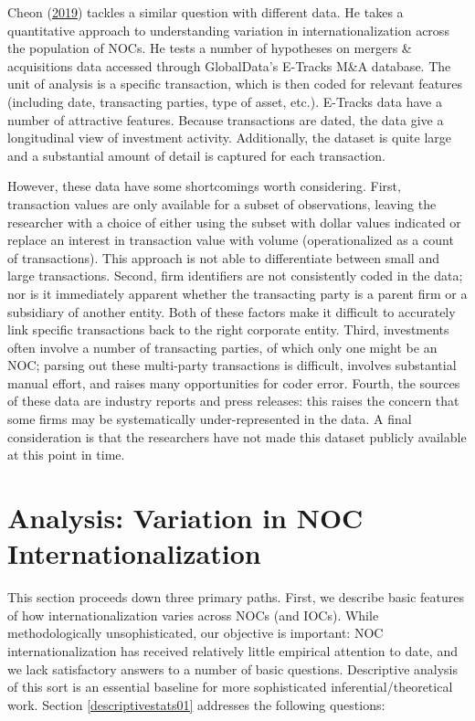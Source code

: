 \documentclass[11pt,]{book}
\begin{document}
Cheon (\protect\hyperlink{ref-cheon_developing_2019}{2019}) tackles a similar question with different data. He takes a quantitative approach to understanding variation in internationalization across the population of NOCs. He tests a number of hypotheses on mergers \& acquisitions data accessed through GlobalData's E-Tracks M\&A database. The unit of analysis is a specific transaction, which is then coded for relevant features (including date, transacting parties, type of asset, etc.). E-Tracks data have a number of attractive features. Because transactions are dated, the data give a longitudinal view of investment activity. Additionally, the dataset is quite large and a substantial amount of detail is captured for each transaction.

However, these data have some shortcomings worth considering. First, transaction values are only available for a subset of observations, leaving the researcher with a choice of either using the subset with dollar values indicated or replace an interest in transaction value with volume (operationalized as a count of transactions). This approach is not able to differentiate between small and large transactions. Second, firm identifiers are not consistently coded in the data; nor is it immediately apparent whether the transacting party is a parent firm or a subsidiary of another entity. Both of these factors make it difficult to accurately link specific transactions back to the right corporate entity. Third, investments often involve a number of transacting parties, of which only one might be an NOC; parsing out these multi-party transactions is difficult, involves substantial manual effort, and raises many opportunities for coder error. Fourth, the sources of these data are industry reports and press releases: this raises the concern that some firms may be systematically under-represented in the data. A final consideration is that the researchers have not made this dataset publicly available at this point in time.

\hypertarget{analysis01}{%
\section{Analysis: Variation in NOC Internationalization}\label{analysis01}}

This section proceeds down three primary paths. First, we describe basic features of how internationalization varies across NOCs (and IOCs). While methodologically unsophisticated, our objective is important: NOC internationalization has received relatively little empirical attention to date, and we lack satisfactory answers to a number of basic questions. Descriptive analysis of this sort is an essential baseline for more sophisticated inferential/theoretical work. Section \ref{descriptivestats01} addresses the following questions:
\end{document}
